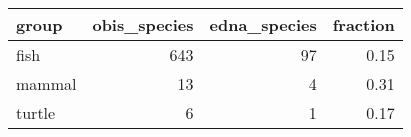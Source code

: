 \begin{longtable}{lrrr}
  \hline
group & obis\_species & edna\_species & fraction \\ 
  \hline
fish & 643 &  97 & 0.15 \\ 
  mammal &  13 &   4 & 0.31 \\ 
  turtle &   6 &   1 & 0.17 \\ 
   \hline
\hline
\end{longtable}
